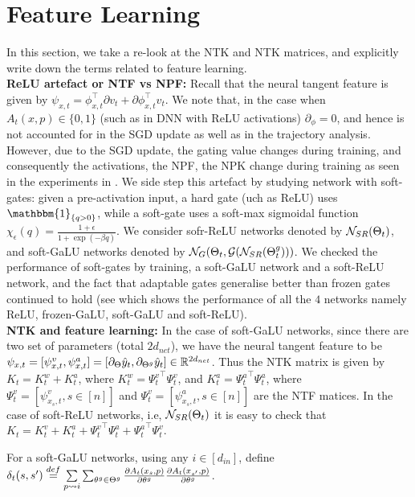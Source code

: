 \section{Feature Learning}
In this section, we take a re-look at the NTK and NTK matrices, and explicitly write down the terms related to feature learning.\hfill\\
\textbf{ReLU artefact or NTF vs NPF:} Recall that the neural tangent feature is given by $\psi_{x,t}=\phi^\top_{x,t} {\partial} v_t + {\partial} \phi^\top_{x,t} v_t$. We note that, in the case when $A_t(x,p)\in\{0,1\}$ (such as in DNN with ReLU activations)  $\partial_{\phi}=0$, and hence is not accounted for in the SGD update as well as in the trajectory analysis. However, due to the SGD update, the gating value changes during training, and consequently the activations, the NPF, the NPK change during training as seen in the experiments in . We side step this artefact by studying network with soft-gates: given a pre-activation input, a hard gate (uch as ReLU) uses $\mathbbm{1}_{\{q>0\}}$, while a soft-gate uses a soft-max sigmoidal function $\chi_\epsilon(q)=\frac{1+\epsilon}{1+\exp(-\beta q)}$. We consider sofr-ReLU networks denoted by $\mathcal{N}_{SR}(\Theta_t)$, and soft-GaLU networks denoted by $\mathcal{N}_{G}(\Theta_t, \mathcal{G}(\mathcal{N}_{SR}({\Theta}^g_t)))$. We checked the performance of soft-gates by training, a soft-GaLU network and a soft-ReLU network, and the fact that adaptable gates generalise better than frozen gates continued to hold (see  which shows the performance of all the $4$ networks namely ReLU, frozen-GaLU, soft-GaLU and soft-ReLU).\hfill\\
\textbf{NTK and feature learning:} In the case of  soft-GaLU networks, since there are two set of parameters (total $2d_{net}$), we have the neural tangent feature to be $\psi_{x,t}=[\psi^v_{x,t},\psi^a_{x,t}]=[\partial_{\Theta} \hat{y}_t, \partial_{{\Theta}^g} \hat{y}_t]\in \mathbb{R}^{2d_{net}}$. Thus the NTK matrix is given by $K_t=K^w_t+K^a_t$,  where $K^w_t={\Psi^v_t}^\top \Psi^v_t$, and $K^a_t={\Psi^a_t}^\top \Psi^a_t$, where $\Psi^v_t=[\psi^v_{x_s,t},s\in[n]]$ and $\Psi^v_t=[\psi^a_{x_s,t},s\in[n]]$ are the NTF matices. In the case of  soft-ReLU networks, i.e, $\mathcal{N}_{SR}(\Theta_t)$  it is easy to check that $K_t={K^v_t}+{K^a_t}+{\Psi^v_t}^\top {\Psi^a_t}+{\Psi^a_t}^\top {\Psi^v_t}$.
\begin{definition}\label{def:delta}
For a soft-GaLU networks, using any $i\in[d_{in}]$, define $\delta_t(s,s')\stackrel{def}= \underset{{p\rightsquigarrow i}}{\sum} \sum_{\theta^g\in{\Theta}^g}\frac{\partial A_{t}(x_s,p)}{\partial \theta^g} \frac{\partial A_{t}(x_{s'},p)}{\partial \theta^g}$.
\end{definition}

